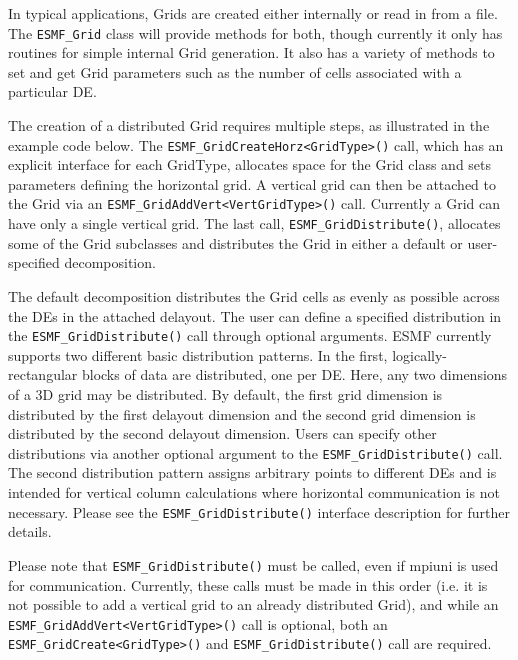 


In typical applications, Grids are created either internally or read in from
a file.  The {\tt ESMF\_Grid} class will provide methods for both, though 
currently it only has routines for simple internal Grid generation.  It also
has a variety of methods to set and get Grid parameters such as the number of
cells associated with a particular DE.  

The creation of a distributed Grid requires multiple steps, as
illustrated in the example code below.  The {\tt ESMF\_GridCreateHorz<GridType>()}
call, which has an explicit interface for each GridType, allocates space for the
Grid class and sets parameters defining the horizontal grid.  A vertical grid
can then be attached to the Grid via an {\tt ESMF\_GridAddVert<VertGridType>()}
call.  Currently a Grid can have only a single vertical grid.  The last call,
{\tt ESMF\_GridDistribute()}, allocates some of the Grid subclasses and
distributes the Grid in either a default or user-specified decomposition.

The default decomposition distributes the Grid cells as evenly as possible across
the DEs in the attached delayout.  The user can define a specified distribution
in the {\tt ESMF\_GridDistribute()} call through optional arguments.  ESMF
currently supports two different basic distribution patterns.  In the first,
logically-rectangular blocks of data are distributed, one per DE.  Here, any two
dimensions of a 3D grid may be distributed.  By default, the first grid
dimension is distributed by the first delayout dimension and the second grid
dimension is distributed by the second delayout dimension.  Users can specify
other distributions via another optional argument to the {\tt ESMF\_GridDistribute()}
call.  The second distribution pattern assigns arbitrary points to different DEs
and is intended for vertical column calculations where horizontal communication
is not necessary.  Please see the {\tt ESMF\_GridDistribute()} interface
description for further details.

Please note that {\tt ESMF\_GridDistribute()} must be called, even if mpiuni is
used for communication.  Currently, these calls must be made in this order
(i.e. it is not possible to add a vertical grid to an already distributed
Grid), and while an {\tt ESMF\_GridAddVert<VertGridType>()} call is optional,
both an {\tt ESMF\_GridCreate<GridType>()} and {\tt ESMF\_GridDistribute()}
call are required.

